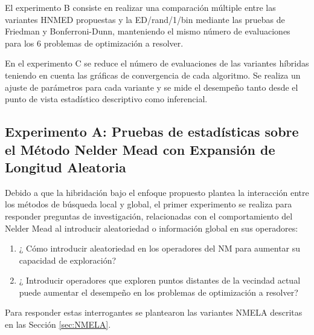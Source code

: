 El experimento B consiste en realizar una comparación múltiple entre las variantes HNMED propuestas y la ED/rand/1/bin mediante las pruebas de Friedman y Bonferroni-Dunn, manteniendo el mismo número de evaluaciones para los 6 problemas de optimización a resolver. 

En el experimento C se reduce el número de evaluaciones de las variantes híbridas teniendo en cuenta las gráficas de convergencia de cada algoritmo. Se realiza un ajuste de parámetros para cada variante y se mide el desempeño tanto desde el punto de vista estadístico descriptivo como inferencial.

 \subsection{Experimento A: Pruebas de estadísticas sobre el Método Nelder Mead con Expansión de Longitud Aleatoria}\label{Experimento A: Pruebas de estadísticas sobre el Método Nelder Mead con Expansión de Longitud Aleatoria}

 Debido a que la hibridación bajo el enfoque propuesto plantea la interacción entre los métodos de búsqueda local y global, el primer experimento se realiza para responder preguntas de investigación, relacionadas con el comportamiento del Nelder Mead al introducir aleatoriedad o información global en sus operadores:
 \begin{enumerate}
 	\item ¿ Cómo introducir aleatoriedad en los operadores del NM para aumentar su capacidad de exploración?
 	\item ¿ Introducir operadores que exploren puntos distantes de la vecindad actual puede aumentar el desempeño en los problemas de optimización a resolver?
 
 \end{enumerate}
Para responder estas interrogantes se plantearon las variantes NMELA descritas en las Sección \ref{sec:NMELA}.
